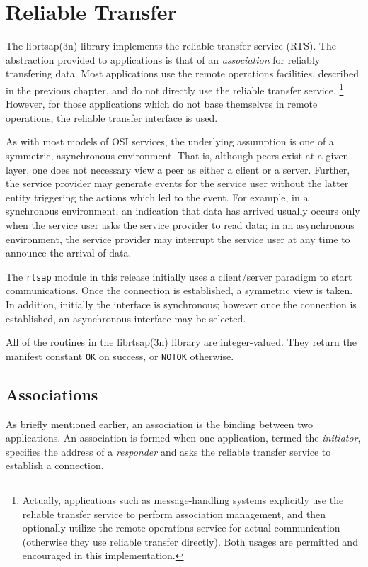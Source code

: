 
\chapter	{Reliable Transfer}\label{librtsap}
The \man librtsap(3n) library implements the reliable transfer service (RTS).
The abstraction provided to applications is that of an {\em association\/}
for reliably transfering data.
Most applications use the remote operations facilities,
described in the previous chapter,
and do not directly use the reliable transfer service.%
\footnote{Actually, applications such as message-handling systems explicitly
use the reliable transfer service to perform association management,
and then optionally utilize the remote operations service for actual
communication (otherwise they use reliable transfer directly). 
Both usages are permitted and encouraged in this implementation.}
However,
for those applications which do not base themselves in remote operations,
the reliable transfer interface is used.

As with most models of OSI services,
the underlying assumption is one of a symmetric, asynchronous environment.
That is,
although peers exist at a given layer,
one does not necessary view a peer as either a client or a server.
Further,
the service provider may generate events for the service user without the
latter entity triggering the actions which led to the event.
For example,
in a synchronous environment,
an indication that data has arrived usually occurs only when the service user
asks the service provider to read data;
in an asynchronous environment,
the service provider may interrupt the service user at any time to announce
the arrival of data.

The \verb"rtsap" module in this release initially uses a client/server
paradigm to start communications.
Once the connection is established,
a symmetric view is taken.
In addition,
initially the interface is synchronous;
however once the connection is established,
an asynchronous interface may be selected.

All of the routines in the \man librtsap(3n) library are integer-valued.
They return the manifest constant \verb"OK" on success,
or \verb"NOTOK" otherwise.

\section	{Associations}\label{rts:associations}
As briefly mentioned earlier,
an association is the binding between two applications.
An association is formed when one application,
termed the {\em initiator},
specifies the address of a {\em responder\/} and asks the reliable transfer
service to establish a connection.

